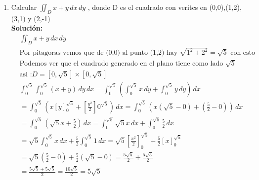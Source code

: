 \documentclass[10pt,letterpaper,fleqn]{article}
\begin{document}
\begin{enumerate}
        \item Calcular $\iint_D{x+y} \, dx\,dy$ , donde D es el cuadrado con veritcs en (0,0),(1,2),(3,1) y (2,-1)
    	\\ \textbf{Solución:}
            	\begin{equation*}
                \begin{split}
                        & 
                        \iint_D{x+y} \, dx\,dy
                        \\& \mbox{Por pitagoras vemos que de (0,0) al punto (1,2) hay $\sqrt{1^2 + 2^2 } = \sqrt{5}$ con esto}
                        \\& \mbox{Podemos ver que el cuadrado generado en el plano tiene como lado $\sqrt{5}$ }
                        \\& \mbox{asi :} D = [0,\sqrt{5}] \times [0,\sqrt{5}]
                        \\& \int_{0}^{\sqrt{5}}{\int_{0}^{\sqrt{5}}{(x+y )}\,dy}\,dx
                        =\int_{0}^{\sqrt{5}}{(\int_{0}^{\sqrt{5}}{x}\,dy +\int_{0}^{\sqrt{5}}{y}\,dy)}\,dx
                        \\& =\int_{0}^{\sqrt{5}}{(x \left[y\right]_0^{\sqrt{5}} +\left[\frac{y^2}{2}\right]0^{\sqrt{5}})}\,dx
                        =\int_{0}^{\sqrt{5}}{( x(\sqrt{5}-0) +(\frac{5}{2}-0)) }\,dx
                        \\& =\int_{0}^{\sqrt{5}}{(\sqrt{5}x +\frac{5}{2})}\,dx
                        =\int_{0}^{\sqrt{5}}{\sqrt{5} x }\,dx+\int_{0}^{\sqrt{5}}{\frac{5}{2}}\,dx
                        \\& =\sqrt{5} \int_{0}^{\sqrt{5}}{ x }\,dx+\frac{5}{2} \int_{0}^{\sqrt{5}}{ 1 }\,dx
                        =\sqrt{5} \left[\frac{x^2}{2}\right]_0^{\sqrt{5}} + \frac{5}{2} \left[x\right]_0^{\sqrt{5}}
                        \\& =\sqrt{5} (\frac{5}{2}-0) + \frac{5}{2} (\sqrt{5}-0)
                        =\frac{5\sqrt{5}}{2} + \frac{5\sqrt{5}}{2}
                        \\& = \frac{5\sqrt{5} + 5\sqrt{5} }{2}
                        = \frac{10\sqrt{5}}{2} 
                        = 5\sqrt{5} 
                \end{split}
                \end{equation*}
		
    \end{enumerate}
        
\end{document}

